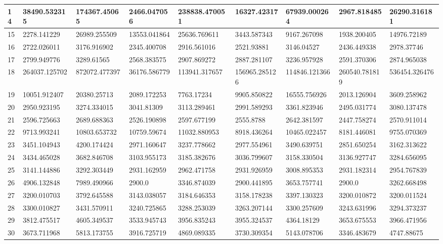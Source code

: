 \begin{table}
\begin{tabular}{|p{0.8cm}|p{1.6cm}|p{1.6cm}|p{1.6cm}|p{1.6cm}|p{1.6cm}|p{1.6cm}|p{1.6cm}|p{1.6cm}|}
 \hline
14  & 38490.532315 & 174367.45065 & 2466.047056 & 238838.470051 & 16327.42317 & 67939.000264 & 2967.818485 & 26290.316181 \\ 
 \hline
15  & 2278.141229 & 26989.255509 & 13553.041864 & 25636.769611 & 3443.587343 & 9167.267098 & 1938.200405 & 14976.72189 \\ 
 \hline
16  & 2722.026011 & 3176.916902 & 2345.400708 & 2916.561016 & 2521.93881 & 3146.04527 & 2436.449338 & 2978.37746 \\ 
 \hline
17  & 2799.949776 & 3289.61565 & 2568.383575 & 2907.869272 & 2887.281107 & 3236.957928 & 2591.370306 & 2874.965038 \\ 
 \hline
18  & 264037.125702 & 872072.477397 & 36176.586779 & 113941.317657 & 156965.285126 & 114846.121366 & 260540.781819 & 536454.326476 \\ 
 \hline
19  & 10051.912407 & 20380.25713 & 2089.172253 & 7763.17234 & 9905.850822 & 16555.756926 & 2013.126904 & 3609.258962 \\ 
 \hline
20  & 2950.923195 & 3274.334015 & 3041.81309 & 3113.289461 & 2991.589293 & 3361.823946 & 2495.031774 & 3080.137478 \\ 
 \hline
21  & 2596.725663 & 2689.688363 & 2526.190898 & 2597.677199 & 2555.8788 & 2642.381597 & 2447.758274 & 2570.911014 \\ 
 \hline
22  & 9713.993241 & 10803.653732 & 10759.59674 & 11032.880953 & 8918.436264 & 10465.022457 & 8181.446081 & 9755.070369 \\ 
 \hline
23  & 3451.104943 & 4200.174424 & 2971.160647 & 3237.778662 & 2977.554961 & 3490.639751 & 2851.650254 & 3162.313622 \\ 
 \hline
24  & 3434.465028 & 3682.846708 & 3103.955173 & 3185.382676 & 3036.799607 & 3158.330504 & 3136.927747 & 3284.656095 \\ 
 \hline
25  & 3141.144886 & 3292.303449 & 2931.162959 & 2962.471758 & 2931.926959 & 3008.895353 & 2931.182314 & 2954.767839 \\ 
 \hline
26  & 4906.132848 & 7989.490966 & 2900.0 & 3346.874039 & 2900.441895 & 3653.757741 & 2900.0 & 3262.668498 \\ 
 \hline
27  & 3200.010703 & 3792.645588 & 3143.038057 & 3184.646353 & 3158.178238 & 3397.130323 & 3200.010872 & 3200.011524 \\ 
 \hline
28  & 3300.010827 & 3431.570911 & 3240.725865 & 3288.253039 & 3263.207144 & 3300.257609 & 3243.631996 & 3294.373237 \\ 
 \hline
29  & 3812.475517 & 4605.349537 & 3533.945743 & 3956.835243 & 3955.324537 & 4364.18129 & 3653.675553 & 3966.471956 \\ 
 \hline
30  & 3673.711968 & 5813.173755 & 3916.725719 & 4869.089335 & 3730.309354 & 5143.078706 & 3346.483679 & 4747.88675 \\ 
 \hline


 \end{tabular}
\end{table}

